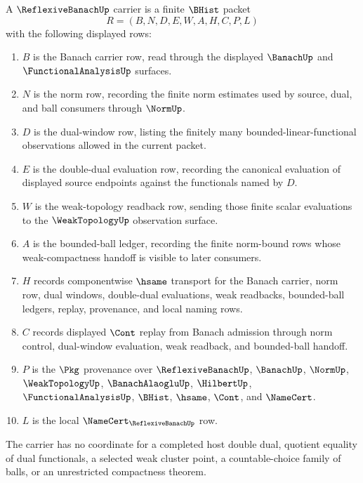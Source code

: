 \begin{definition}
\label{def:reflexive-banach-carrier}
A $\ReflexiveBanachUp$ carrier is a finite $\BHist$ packet
$$
R=(B,N,D,E,W,A,H,C,P,L)
$$
with the following displayed rows:
\begin{enumerate}
\item $B$ is the Banach carrier row, read through the displayed $\BanachUp$ and $\FunctionalAnalysisUp$ surfaces.
\item $N$ is the norm row, recording the finite norm estimates used by source, dual, and ball consumers through $\NormUp$.
\item $D$ is the dual-window row, listing the finitely many bounded-linear-functional observations allowed in the current packet.
\item $E$ is the double-dual evaluation row, recording the canonical evaluation of displayed source endpoints against the functionals named by $D$.
\item $W$ is the weak-topology readback row, sending those finite scalar evaluations to the $\WeakTopologyUp$ observation surface.
\item $A$ is the bounded-ball ledger, recording the finite norm-bound rows whose weak-compactness handoff is visible to later consumers.
\item $H$ records componentwise $\hsame$ transport for the Banach carrier, norm row, dual windows, double-dual evaluations, weak readbacks, bounded-ball ledgers, replay, provenance, and local naming rows.
\item $C$ records displayed $\Cont$ replay from Banach admission through norm control, dual-window evaluation, weak readback, and bounded-ball handoff.
\item $P$ is the $\Pkg$ provenance over $\ReflexiveBanachUp$, $\BanachUp$, $\NormUp$, $\WeakTopologyUp$, $\BanachAlaogluUp$, $\HilbertUp$, $\FunctionalAnalysisUp$, $\BHist$, $\hsame$, $\Cont$, and $\NameCert$.
\item $L$ is the local $\NameCert_{\ReflexiveBanachUp}$ row.
\end{enumerate}
The carrier has no coordinate for a completed host double dual, quotient equality of dual functionals, a selected weak cluster point, a countable-choice family of balls, or an unrestricted compactness theorem.
\end{definition}

